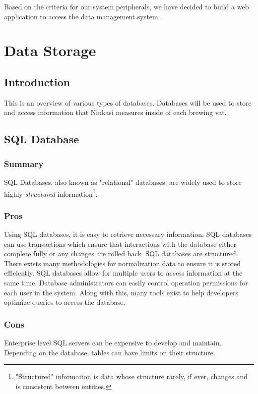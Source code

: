 \documentclass[draftclsnofoot,onecolumn,letterpaper,10pt,compsoc]{IEEEtran}
\begin{document}
		    Based on the criteria for our system peripherals, we have decided to build a web application to access the data management system.

		\section{Data Storage}
		    \subsection{Introduction}
		    This is an overview of various types of databases. Databases will be used to store and access information that Ninkasi measures inside of each brewing vat.

			\subsection{SQL Database}
		        \subsubsection{Summary}
		            SQL Databases, also known as "relational" databases, are widely used to store highly \textit{structured} information\footnote{"Structured" information is data whose structure rarely, if ever, changes and is consistent between entities.}.

		        \subsubsection{Pros}
		            Using SQL databases, it is easy to retrieve necessary information.
		            SQL databases can use transactions which ensure that interactions with the database either complete fully or any changes are rolled back.
		            SQL databases are structured.
		            There exists many methodologies for normalization data to ensure it is stored efficiently\cite{TechwallaSQL}.
		            SQL databases allow for multiple users to access information at the same time\cite{TechwallaSQLPros}.
		            Database administrators can easily control operation permissions for each user in the system.
		            Along with this, many tools exist to help developers optimize queries to access the database.

		        \subsubsection{Cons}
		            Enterprise level SQL servers can be expensive to develop and maintain.
		            Depending on the database, tables can have limits on their structure\cite{TechwallaSQLCons}.
\end{document}

